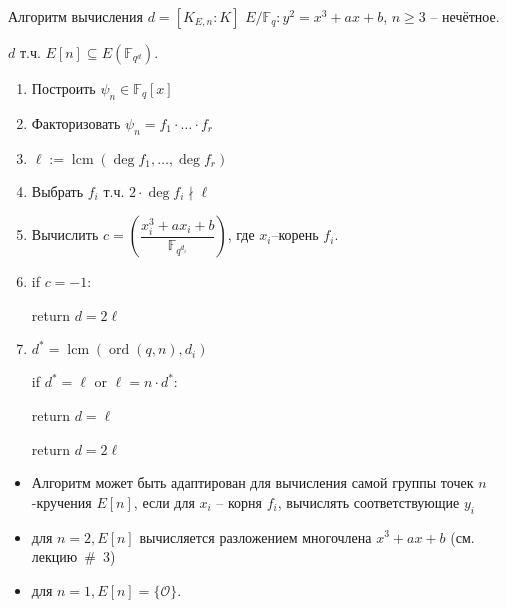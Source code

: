 \documentclass{beamer}
\begin{document}
\begin{frame}{Алгоритм вычисления $d = [K_{E,n}:K]$}
     $ E/\mathbb{F}_q: y^2 = x^3 + a x + b$, $n \geqslant 3$ -- нечётное.
    
     $d$ т.ч. $E[n] \subseteq E(\mathbb{F}_{q^d})$.
    
    \begin{enumerate}
        \item Построить $\psi_n \in \mathbb{F}_q[x]$
        \item Факторизовать $\psi_n = {f_1} \cdot \ldots \cdot {f_r}$
        \item $\ell := \operatorname{lcm}(\deg{f_1}, \ldots, \deg{f_r})$
        \item Выбрать $f_i$ т.ч. $2 \cdot \deg {f_i} \nmid \ell$
        \item Вычислить $c = \left(\dfrac{x_i^3 + a {x_i} + b}{\mathbb{F}_{q^{d_i}}}\right)$, где $x_i$--корень $f_i$.
        
        \item if $c = - 1$:
        
        \quad return $d = 2\ell$
        
        \item ${d^*} = \operatorname{lcm}( \operatorname{ord} ({q,n}),{d_i})$
        
        if ${d^*} = \ell$ or $\ell = n \cdot {d^*}$:
        
        \quad return $d = \ell$
        
        return $d = 2\ell$ 
    \end{enumerate}
\end{frame}

\begin{frame}{}
    \begin{itemize}
        \item Алгоритм может быть адаптирован для вычисления самой группы точек $n$-кручения $E[ n]$, если для ${x_i}$ -- корня ${f_i}$, вычислять соответствующие ${y_i}$
        \item для $n = 2, E[n]$ вычисляется разложением многочлена ${x^3} + a x + b$ (см. лекцию~\#~3)
        \item для $n = 1, E[n] = \{ \mathcal{O} \}$. 
    \end{itemize}
\end{frame}
\end{document}
